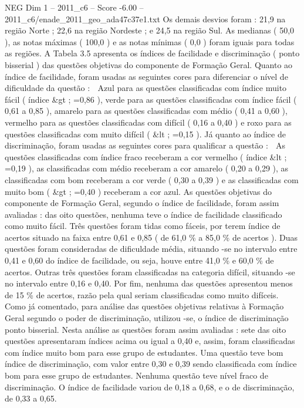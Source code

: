 \begin{textsample}{NEG Dim 1 – 2011\_c6 – Score -6.00 – 2011\_c6/enade\_2011\_geo\_ada47c37e1.txt}
Os demais desvios foram : 21,9 na região Norte ; 22,6 na região Nordeste ; e 24,5 na região Sul.
As medianas ( 50,0 ), as notas máximas ( 100,0 ) e as notas mínimas ( 0,0 ) foram iguais para todas as regiões.
A Tabela 3.5 apresenta os índices de facilidade e discriminação ( ponto bisserial ) das questões objetivas do componente de Formação Geral.
Quanto ao índice de facilidade, foram usadas as seguintes cores para diferenciar o nível de dificuldade da questão :  Azul para as questões classificadas com índice muito fácil ( índice \&gt ; =0,86 ), verde para as questões classificadas com índice fácil ( 0,61 a 0,85 ), amarelo para as questões classificadas com médio ( 0,41 a 0,60 ), vermelho para as questões classificadas com difícil ( 0,16 a 0,40 ) e roxo para as questões classificadas com muito difícil ( \&lt ; =0,15 ).
Já quanto ao índice de discriminação, foram usadas as seguintes cores para qualificar a questão :  As questões classificadas com índice fraco receberam a cor vermelho ( índice \&lt ; =0,19 ), as classificadas com médio receberam a cor amarelo ( 0,20 a 0,29 ), as classificadas com bom receberam a cor verde ( 0,30 a 0,39 ) e as classificadas com muito bom ( \&gt ; =0,40 ) receberam a cor azul.
As questões objetivas do componente de Formação Geral, segundo o índice de facilidade, foram assim avaliadas : das oito questões, nenhuma teve o índice de facilidade classificado como muito fácil.
Três questões foram tidas como fáceis, por terem índice de acertos situado na faixa entre 0,61 e 0,85 ( de 61,0 \% a 85,0 \% de acertos ).
Duas questões foram consideradas de dificuldade média, situando -se no intervalo entre 0,41 e 0,60 do índice de facilidade, ou seja, houve entre 41,0 \% e 60,0 \% de acertos.
Outras três questões foram classificadas na categoria difícil, situando -se no intervalo entre 0,16 e 0,40.
Por fim, nenhuma das questões apresentou menos de 15 \% de acertos, razão pela qual seriam classificadas como muito difíceis.
Como já comentado, para análise das questões objetivas relativas à Formação Geral segundo o poder de discriminação, utilizou -se, o índice de discriminação ponto bisserial.
Nesta análise as questões foram assim avaliadas : sete das oito questões apresentaram índices acima ou igual a 0,40 e, assim, foram classificadas com índice muito bom para esse grupo de estudantes.
Uma questão teve bom índice de discriminação, com valor entre 0,30 e 0,39 sendo classificada com índice bom para esse grupo de estudantes.
Nenhuma questão teve nível fraco de discriminação.
O índice de facilidade variou de 0,18 a 0,68, e o de discriminação, de 0,33 a 0,65.

\end{textsample}
